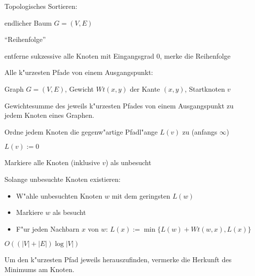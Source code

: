 \algorithm Topologisches Sortieren:{
  \given endlicher Baum $G=(V,E)$
  
  \aim ``Reihenfolge''
  
  \begin{proc}
    \item 
      entferne sukzessive alle Knoten mit Eingangsgrad $0$, merke die Reihenfolge
  \end{proc}
}
\algorithm Alle k"urzesten Pfade von einem Ausgangspunkt:{
  \given Graph $G=(V,E)$, Gewicht $Wt(x,y)$ der Kante $(x,y)$, Startknoten $v$
  
  \aim Gewichtesumme des jeweils k"urzesten Pfades von einem Ausgangspunkt 
    zu jedem Knoten eines Graphen.
  
  \begin{proc}
    \item Ordne jedem Knoten die gegenw"artige Pfadl"ange $L(v)$ zu 
      (anfangs $\infty$)
    \item $L(v):=0$
    \item Markiere alle Knoten  (inklusive $v$) als unbesucht
    \item Solange unbesuchte Knoten existieren:
      \begin{itemize}
        \item W"ahle unbesuchten Knoten $w$ mit dem geringsten $L(w)$
        \item Markiere $w$ als besucht
        \item F"ur jeden Nachbarn $x$ von $w$: 
          $L(x):=\min\{ L(w)+Wt(w,x),L(x) \}$
      \end{itemize}
  \end{proc}
  
  \cpx $O((|V|+|E|)\log |V|)$
  
  Um den k"urzesten Pfad jeweils herauszufinden, vermerke die Herkunft
  des Minimums am Knoten.
}
